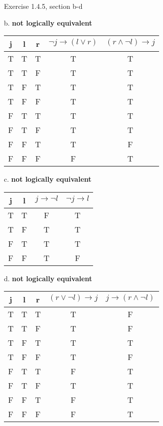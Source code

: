 \documentclass[11pt]{article}
\begin{document}
	Exercise 1.4.5, section b-d
	\medskip
	
	b. \textbf{not logically equivalent}
	\begin{center}
    \begin{tabular}{||c c c c c||} 
    \hline
    j & l & r & $\neg j\xrightarrow[]{}(l\vee r)$ & $(r\wedge \neg l)\xrightarrow[]{}j$\\ [0.5ex] 
    \hline\hline
    T & T & T & T & T\\ 
    \hline
    T & T & F & T & T\\ 
    \hline
    T & F & T & T & T\\ 
    \hline
    T & F & F & T & T\\ 
    \hline
    F & T & T & T & T\\ 
    \hline
    F & T & F & T & T\\ 
    \hline
    F & F & T & T & F\\ 
    \hline
    F & F & F & F & T\\ 
    \hline
    \end{tabular}
    \end{center}

    c. \textbf{not logically equivalent}
    \begin{center}
    \begin{tabular}{||c c c c||} 
    \hline
    j & l & $j\xrightarrow[]{}\neg l$ & $\neg j\xrightarrow[]{}l$ \\ [0.5ex] 
    \hline\hline
    T & T & F & T \\ 
    \hline
    T & F & T & T \\
    \hline
    F & T & T & T \\
    \hline
    F & F & T & F \\
    \hline
    \end{tabular}
    \end{center}
    
    d. \textbf{not logically equivalent}
    \begin{center}
    \begin{tabular}{||c c c c c||} 
    \hline
    j & l & r & $(r\vee \neg l)\xrightarrow[]{}j$ & $j\xrightarrow[]{}(r\wedge \neg l)$\\ [0.5ex] 
    \hline\hline
    T & T & T & T & F\\ 
    \hline
    T & T & F & T & F\\ 
    \hline
    T & F & T & T & T\\ 
    \hline
    T & F & F & T & F\\ 
    \hline
    F & T & T & F & T\\ 
    \hline
    F & T & F & T & T\\ 
    \hline
    F & F & T & F & T\\ 
    \hline
    F & F & F & F & T\\ 
    \hline
    \end{tabular}
    \end{center}
    
\end{document}
